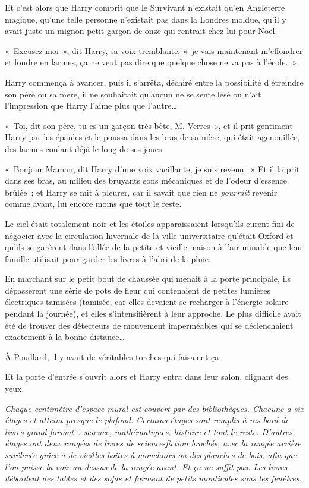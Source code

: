 Et c'est alors que Harry comprit que le Survivant n'existait qu'en Angleterre magique, qu'une telle personne n'existait pas dans la Londres moldue, qu'il y avait juste un mignon petit garçon de onze qui rentrait chez lui pour Noël.

«~Excusez-moi~», dit Harry, sa voix tremblante, «~je vais maintenant m'effondrer et fondre en larmes, ça ne veut pas dire que quelque chose ne va pas à l'école.~»

Harry commença à avancer, puis il s'arrêta, déchiré entre la possibilité d'étreindre son père ou sa mère, il ne souhaitait qu'aucun ne se sente lésé ou n'ait l'impression que Harry l'aime plus que l'autre…

«~Toi, dit son père, tu es un garçon très bête, M. Verres~», et il prit gentiment Harry par les épaules et le poussa dans les bras de sa mère, qui était agenouillée, des larmes coulant déjà le long de ses joues.

«~Bonjour Maman, dit Harry d'une voix vacillante, je suis revenu.~» Et il la prit dans ses bras, au milieu des bruyants sons mécaniques et de l'odeur d'essence brûlée~; et Harry se mit à pleurer, car il savait que rien ne \emph{pourrait} revenir comme avant, lui encore moins que tout le reste.

\later

Le ciel était totalement noir et les étoiles apparaissaient lorsqu'ils eurent fini de négocier avec la circulation hivernale de la ville universitaire qu'était Oxford et qu'ils se garèrent dans l'allée de la petite et vieille maison à l'air minable que leur famille utilisait pour garder les livres à l'abri de la pluie.

En marchant sur le petit bout de chaussée qui menait à la porte principale, ils dépassèrent une série de pots de fleur qui contenaient de petites lumières électriques tamisées (tamisée, car elles devaient se recharger à l'énergie solaire pendant la journée), et elles s'intensifièrent à leur approche. Le plus difficile avait été de trouver des détecteurs de mouvement imperméables qui se déclenchaient exactement à la bonne distance…

À Poudlard, il y avait de véritables torches qui faisaient ça.

Et la porte d'entrée s'ouvrit alors et Harry entra dans leur salon, clignant des yeux.

\emph{Chaque centimètre d'espace mural est couvert par des bibliothèques. Chacune a six étages et atteint presque le plafond. Certains étages sont remplis à ras bord de livres grand format~: science, mathématiques, histoire et tout le reste. D'autres étages ont deux rangées de livres de science-fiction brochés, avec la rangée arrière surélevée grâce à de vieilles boîtes à mouchoirs ou des planches de bois, afin que l'on puisse la voir au-dessus de la rangée avant. Et ça ne suffit pas. Les livres débordent des tables et des sofas et forment de petits monticules sous les fenêtres.}

